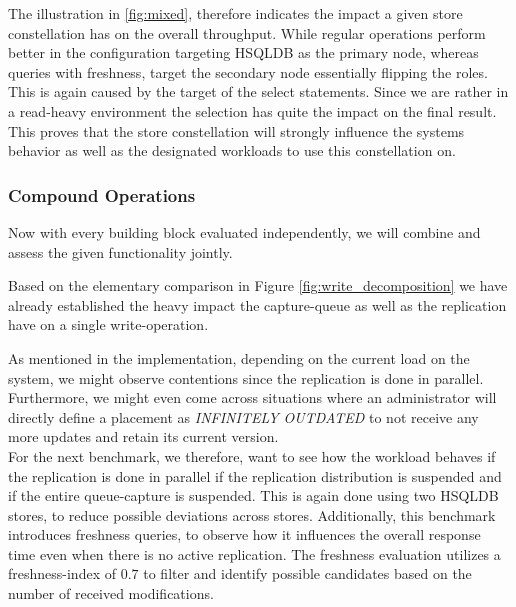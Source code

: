 The illustration in \ref{fig:mixed}, therefore indicates the impact a given store constellation has on the overall throughput.
While regular operations perform better in the configuration targeting HSQLDB as the primary node,
whereas queries with freshness, target the secondary node essentially flipping the roles.
This is again caused by the target of the select statements. 
Since we are rather in a read-heavy environment the selection has quite the impact on the final result.
This proves that the store constellation will strongly influence the systems behavior as well as the designated workloads to use this constellation on.


\subsubsection{Compound Operations} 

Now with every building block evaluated independently, we will combine and assess the given functionality jointly.



Based on the elementary comparison in Figure \ref{fig:write_decomposition} we have already established the heavy impact the capture-queue as well as the 
replication have on a single write-operation.

As mentioned in the implementation, depending on the current load on the system, we might observe contentions since the replication is done in parallel.
Furthermore, we might even come across situations where an administrator will directly define a placement as \emph{INFINITELY OUTDATED} to not receive any more updates
and retain its current version.\\
For the next benchmark, we therefore, want to see how the workload behaves if the replication is done in parallel if the replication distribution is suspended
and if the entire queue-capture is suspended.
This is again done using two HSQLDB stores, to reduce possible deviations across stores. 
Additionally, this benchmark introduces freshness queries, to observe how it influences the overall response time even when there is no active replication. 
The freshness evaluation utilizes a freshness-index of $0.7$ to filter and identify possible candidates based on the number of received modifications.


